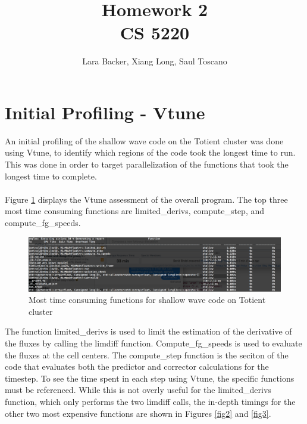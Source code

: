 \documentclass{article}
\begin{document}
\title{Homework 2\\CS 5220}
\author{Lara Backer, Xiang Long, Saul Toscano}

\maketitle

\section*{Initial Profiling - Vtune}
\bigskip An initial profiling of the shallow wave code on the Totient cluster was done using Vtune, to identify which regions of the code took the longest time to run. This was done in order to target parallelization of the functions that took the longest time to complete. \\ \\
Figure \ref{fig1} displays the Vtune assessment of the overall program. The top three most time consuming functions are limited\_derivs, compute\_step, and compute\_fg\_speeds. 

 \begin{figure}[here]
  \centering
  \includegraphics[width=0.8\linewidth]{vtune_orig_water_code.png}
  \caption{Most time consuming functions for shallow wave code on Totient cluster}
  \label{fig1}
\end{figure}

\noindent The function limited\_derivs is used to limit the estimation of the derivative of the fluxes by calling the limdiff function. Compute\_fg\_speeds is used to evaluate the fluxes at the cell centers. The compute\_step function is the seciton of the code that evaluates both the predictor and corrector calculations for the timestep. To see the time spent in each step using Vtune, the specific functions must be referenced. While this is not overly useful for the limited\_derivs function, which only performs the two limdiff calls, the in-depth timings for the other two most expensive functions are shown in Figures \ref{fig2} and \ref{fig3}.
 
\end{document}
